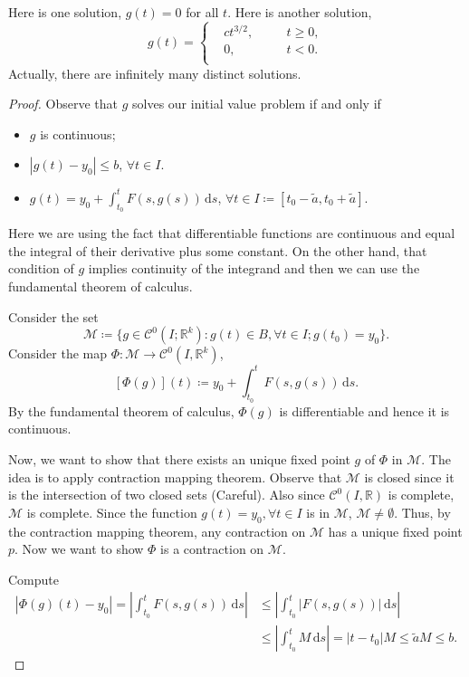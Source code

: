 \documentclass[12pt]{article}
\theoremstyle{plain}
\theoremstyle{definition}
\begin{document}
    Here is one solution, $g(t)=0$ for all $t$.
    Here is another solution,
        $$g(t)=\left\{
            \begin{aligned}
                &ct^{3/2},\quad&&t\geq0,\\
                &0,&& t<0.\\
            \end{aligned}
        \right.$$
    Actually, there are infinitely many distinct solutions.
\begin{proof}
    Observe that $g$ solves our initial value problem if and only if
    \begin{itemize}
        \item $g$ is continuous;
        \item $|g(t)-y_0|\leq b$, $\forall t\in I$.
        \item $g(t)=y_0+\int_{t_0}^t F(s,g(s))\,\mathrm{d}s$, $\forall t\in
        I\coloneqq[t_0-\tilde{a},t_0+\tilde{a}]$.
    \end{itemize}
    Here we are using the fact that differentiable functions are continuous and
    equal the integral of their derivative plus some constant.
    On the other hand, that condition of $g$ implies continuity of the integrand
    and then we can use the fundamental theorem of calculus.

    Consider the set
    $$\mathcal{M}\coloneqq\{g\in\mathcal{C}^0(I;\mathbb{R}^k):g(t)\in B,\forall t\in I;
    g(t_0)=y_0\}.$$
    Consider the map $\Phi:\mathcal{M}\rightarrow \mathcal{C}^0(I,\mathbb{R}^k)$,
    $$[\Phi(g)](t)\coloneqq y_0+\int_{t_0}^t F(s,g(s))\,\mathrm{d}s.$$
    By the fundamental theorem of calculus, $\Phi(g)$ is differentiable and
    hence it is continuous.

    Now, we want to show that there exists an unique fixed point $g$ of $\Phi$ in
    $\mathcal{M}$.
    The idea is to apply contraction mapping theorem.
    Observe that $\mathcal{M}$ is closed since it is the intersection of two
    closed sets (Careful).
    Also since $\mathcal{C}^0(I,\mathbb{R})$ is complete, $\mathcal{M}$ is
    complete.
    Since the function $g(t)=y_0, \forall t\in I$ is in $\mathcal{M}$,
    $\mathcal{M}\neq\emptyset$.
    Thus, by the contraction mapping theorem, any contraction on $\mathcal{M}$
    has a unique fixed point $p$.
    Now we want to show $\Phi$ is a contraction on $\mathcal{M}$.

    Compute 
    $$\begin{aligned}
        |\Phi(g)(t)-y_0|=\left|\int_{t_0}^tF(s,g(s))\,\mathrm{d}s\right|
        &\leq \left|\int_{t_0}^t |F(s,g(s))|\,\mathrm{d}s\right|\\
        &\leq \left|\int_{t_0}^t M\,\mathrm{d}s\right|=|t-t_0|M\leq\tilde{a} M\leq b.
    \end{aligned}$$


\end{proof}
\end{document}

